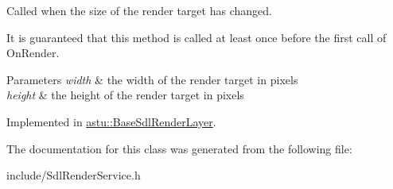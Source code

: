 Called when the size of the render target has changed.

It is guaranteed that this method is called at least once before the first call of {\ttfamily On\+Render}.


\begin{DoxyParams}{Parameters}
{\em width} & the width of the render target in pixels \\
\hline
{\em height} & the height of the render target in pixels \\
\hline
\end{DoxyParams}


Implemented in \hyperlink{classastu_1_1BaseSdlRenderLayer_a5b9f77db50819d6b29e0e8361d7fd91e}{astu\+::\+Base\+Sdl\+Render\+Layer}.



The documentation for this class was generated from the following file\+:\begin{DoxyCompactItemize}
\item 
include/Sdl\+Render\+Service.\+h\end{DoxyCompactItemize}
